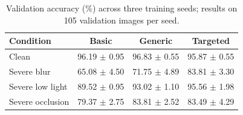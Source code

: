 \begin{table}[t]
\centering
\caption{Validation accuracy (\%) across three training seeds; results on 105 validation images per seed.}
\label{tab:pilot_robustness}
\begin{tabular}{lccc}
\toprule
Condition & Basic & Generic & Targeted \\
\midrule
Clean & 96.19 $\pm$ 0.95 & 96.83 $\pm$ 0.55 & 95.87 $\pm$ 0.55 \\
Severe blur & 65.08 $\pm$ 4.50 & 71.75 $\pm$ 4.89 & 83.81 $\pm$ 3.30 \\
Severe low light & 89.52 $\pm$ 0.95 & 93.02 $\pm$ 1.10 & 95.56 $\pm$ 1.98 \\
Severe occlusion & 79.37 $\pm$ 2.75 & 83.81 $\pm$ 2.52 & 83.49 $\pm$ 4.29 \\
\bottomrule
\end{tabular}
\end{table}

